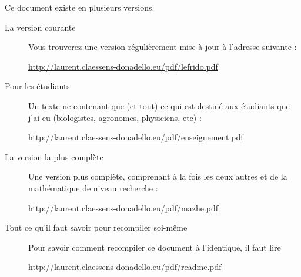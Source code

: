 
\thispagestyle{empty}

Ce document existe en plusieurs versions.
\begin{description}

    \item[La version courante] 

        Vous trouverez une version régulièrement mise à jour à l'adresse suivante :
        \begin{center}
            \url{http://laurent.claessens-donadello.eu/pdf/lefrido.pdf}
        \end{center}
        
    \item[Pour les étudiants]

        Un texte ne contenant que (et tout) ce qui est destiné aux étudiants que j'ai eu (biologistes, agronomes, physiciens, etc) :
        \begin{center}
        \url{http://laurent.claessens-donadello.eu/pdf/enseignement.pdf}
        \end{center}

    \item[La version la plus complète]

        Une version plus complète, comprenant à la fois les deux autres et de la mathématique de niveau recherche : 
        \begin{center}
        \url{http://laurent.claessens-donadello.eu/pdf/mazhe.pdf}
        \end{center}

    \item[Tout ce qu'il faut savoir pour recompiler soi-même]
        Pour savoir comment recompiler ce document à l'identique, il faut lire
        \begin{center}
            \url{http://laurent.claessens-donadello.eu/pdf/readme.pdf}
        \end{center}

\end{description}


\vfill

\clearpage
